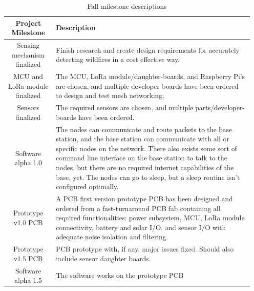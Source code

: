 \documentclass{article}
\begin{document}
%
%
\begin{table}[H]
    \centering
    \begin{tabularx}{\linewidth}{|c|X|}
        \hline
        Project Milestone & Description 
        \\
        \hline\hline
        Sensing mechanism finalized &
        Finish research and create design requirements for accurately detecting wildfires in a cost effective way.
        \\
        
        
        \hline
        MCU and LoRa module finalized &
        The MCU, LoRa module/daughter-boards, and Raspberry Pi's are chosen, and multiple developer boards have been ordered to design and test mesh networking.
        \\
        
        \hline
        Sensors finalized 
        & The required sensors are chosen, and multiple parts/developer-boards have been ordered.
        \\
        
        \hline
        Software alpha 1.0 
        & The nodes can communicate and route packets to the base station, and the base station can communicate with all or specific nodes on the network. There also exists some sort of command line interface on the base station to talk to the nodes, but there are no required internet capabilities of the base, yet. The nodes can go to sleep, but a sleep routine isn't configured optimally.
        \\
        
        \hline
        Prototype v1.0 PCB 
        & A PCB first version prototype PCB has been designed and ordered from a fast-turnaround PCB fab containing all required functionalities: power subsystem, MCU, LoRa module connectivity, battery and solar I/O, and sensor I/O with adequate noise isolation and filtering.
        \\
        
        \hline
        Prototype v1.5 PCB
        & PCB prototype with, if any, major issues fixed. Should also include sensor daughter boards.
        \\
        
        \hline
        Software alpha 1.5
        & The software works on the prototype PCB
        \\
        
        \hline
    \end{tabularx}
    \caption{Fall milestone descriptions}
\end{table}
\end{document}
